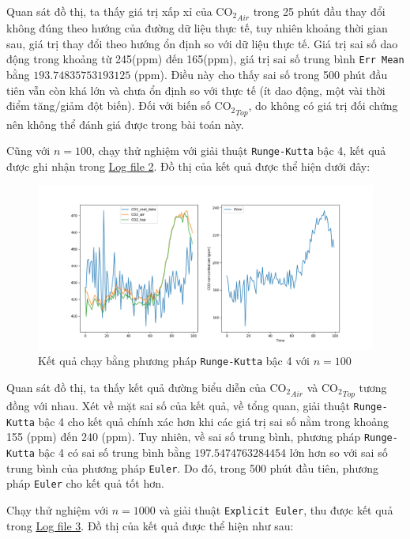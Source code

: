 \documentclass[a4paper]{article}
\begin{document}
Quan sát đồ thị, ta thấy giá trị xấp xỉ của $\mathrm{CO_{2}}_{Air}$ trong 25 phút đầu thay đổi không đúng theo hướng của đường dữ liệu thực tế, tuy nhiên khoảng thời gian sau, giá trị thay đổi theo hướng ổn định so với dữ liệu thực tế. Giá trị sai số dao động trong khoảng từ 245(ppm) đến 165(ppm), giá trị sai số trung bình \texttt{Err Mean} bằng $193.74835753193125$ (ppm). Điều này cho thấy sai số trong 500 phút đầu tiên vẫn còn khá lớn và chưa ổn định so với thực tế (ít dao động, một vài thời điểm tăng/giảm đột biến). Đối với biến số $\mathrm{CO_{2}}_{Top}$, do không có giá trị đối chứng nên không thể đánh giá được trong bài toán này.
\newpage

Cũng với $n = 100$, chạy thử nghiệm với giải thuật \texttt{Runge-Kutta} bậc 4, kết quả được ghi nhận trong \href{https://files.catbox.moe/pwi9f6.txt}{Log file 2}. Đồ thị của kết quả được thể hiện dưới đây:

\begin{figure}[!h]
    \centering
    \includegraphics[width=16cm]{rk4.png}
    \caption{Kết quả chạy bằng phương pháp \texttt{Runge-Kutta} bậc 4 với $n=100$}
    \label{fig:rk4}
\end{figure}

Quan sát đồ thị, ta thấy kết quả đường biểu diễn của ${\mathrm{CO_{2}}_{Air}}$ và ${\mathrm{CO_{2}}}_{Top}$ tương đồng với nhau. Xét về mặt sai số của kết quả, về tổng quan, giải thuật \texttt{Runge-Kutta} bậc 4 cho kết quả chính xác hơn khi các giá trị sai số nằm trong khoảng 155 (ppm) đến 240 (ppm). Tuy nhiên, về sai số trung bình, phương pháp \texttt{Runge-Kutta} bậc 4 có sai số trung bình bằng $197.5474763284454$ lớn hơn so với sai số trung bình của phương pháp \texttt{Euler}. Do đó, trong 500 phút đầu tiên, phương pháp \texttt{Euler} cho kết quả tốt hơn.

\newpage

Chạy thử nghiệm với $n = 1000$ và giải thuật \texttt{Explicit Euler}, thu được kết quả trong \href{https://files.catbox.moe/jsdfif.txt}{Log file 3}. Đồ thị của kết quả được thể hiện như sau:
\end{document}
